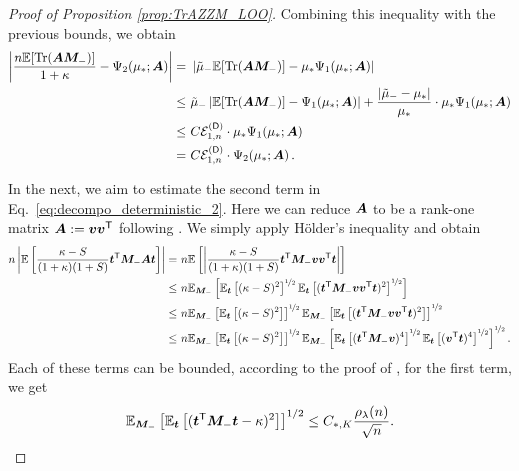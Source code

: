 \begin{proof}[Proof of Proposition \ref{prop:TrAZZM_LOO}]
Combining this inequality with the previous bounds, we obtain
\[
\begin{aligned}
 \left|\frac{n\mathbb{E}[{\rm Tr} ({\boldsymbol A} {\boldsymbol M}_-)]}{1 + \kappa} - \Psi_2( \mu_* ; {\boldsymbol A})\right| =&~ \left|\Tilde{\mu}_-\mathbb{E}[{\rm Tr} (  {\boldsymbol A} {\boldsymbol M}_- )] - \mu_*\Psi_1(\mu_* ;{\boldsymbol A})\right| \\
 \leq&~ \Tilde{\mu}_- \left| \mathbb{E}[{\rm Tr} ({\boldsymbol A} {\boldsymbol M}_-)] - \Psi_1 ( \mu_* ; {\boldsymbol A}) \right| + \frac{| \Tilde{\mu}_- - \mu_*|}{\mu_*} \cdot \mu_* \Psi_1 ( \mu_* ; {\boldsymbol A})\\ 
 \leq&~ C {\mathcal E}_{1,n}^{({\sf D})} \cdot \mu_*\Psi_1 (\mu_* ; {\boldsymbol A})\\
 =&~ C {\mathcal E}_{1,n}^{({\sf D})} \cdot \Psi_2 (\mu_* ; {\boldsymbol A})\,.\\
\end{aligned}
\]

In the next, we aim to estimate the second term in Eq.~\eqref{eq:decompo_deterministic_2}. Here we can reduce ${\boldsymbol A}$ to be a rank-one matrix ${\boldsymbol A}:= \bm v \bm v^{{\mathsf T}}$ following \citet[Eq. (77)]{misiakiewicz2024non}. We simply apply H\"older's inequality and obtain
\begin{align*}
n\left| \mathbb{E}\left[\frac{\kappa- S}{(1+\kappa)(1+S)}{\boldsymbol t}^{\mathsf T} {\boldsymbol M}_- {\boldsymbol A} {\boldsymbol t}\right]\right| =&~ n \mathbb{E}\left[\left|\frac{\kappa- S}{(1+\kappa)(1+S)}{\boldsymbol t}^{\mathsf T} {\boldsymbol M}_- {\boldsymbol v} {\boldsymbol v}^{\mathsf T} {\boldsymbol t}\right|\right]\\
\leq&~ n\mathbb{E}_{\bm M_-} \left[ \mathbb{E}_{{\boldsymbol t}}\left[(\kappa - S)^2 \right]^{\nicefrac{1}{2}} \mathbb{E}_{{\boldsymbol t}}\left[({\boldsymbol t}^{\mathsf T} {\boldsymbol M}_- {\boldsymbol v} {\boldsymbol v}^{\mathsf T} {\boldsymbol t})^2\right]^{\nicefrac{1}{2}} \right]\\
\leq&~ n\mathbb{E}_{\bm M_-} \left[ \mathbb{E}_{{\boldsymbol t}}\left[(\kappa - S)^2 \right]\right]^{\nicefrac{1}{2}} \mathbb{E}_{{\boldsymbol M}_-}\left[\mathbb{E}_{{\boldsymbol t}}\left[({\boldsymbol t}^{\mathsf T} {\boldsymbol M}_- {\boldsymbol v} {\boldsymbol v}^{\mathsf T} {\boldsymbol t})^2\right] \right]^{\nicefrac{1}{2}}\\
\leq&~ n\mathbb{E}_{\bm M_-} \left[ \mathbb{E}_{{\boldsymbol t}}\left[(\kappa - S)^2 \right]\right]^{\nicefrac{1}{2}} \mathbb{E}_{{\boldsymbol M}_-}\left[\mathbb{E}_{{\boldsymbol t}}\left[({\boldsymbol t}^{\mathsf T} {\boldsymbol M}_- {\boldsymbol v})^{4}\right]^{\nicefrac{1}{2}} \mathbb{E}_{\boldsymbol t}\left[({\boldsymbol v}^{\mathsf T} {\boldsymbol t})^4\right]^{\nicefrac{1}{2}} \right]^{\nicefrac{1}{2}}.
\end{align*}
Each of these terms can be bounded, according to the proof of \citet[Proposition 2]{misiakiewicz2024non}, for the first term, we get
\[
 \mathbb{E}_{{\boldsymbol M}_-} \left[ \mathbb{E}_{{\boldsymbol t}} \left[ ( {\boldsymbol t}^{\mathsf T} {\boldsymbol M}_- {\boldsymbol t} - \kappa)^2\right] \right]^{1/2 } \leq  C_{*,K} \frac{ \rho_\lambda (n)}{\sqrt{n}} .
\]


\end{proof}
